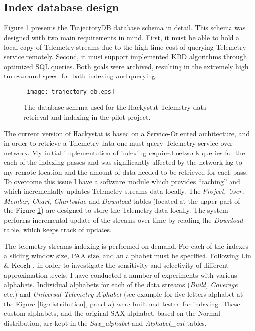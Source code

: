 \subsection{Index database design} \label{indexing_design}
Figure \ref{fig:trajectory_db} presents the TrajectoryDB database schema in detail. This schema was designed with two main requirements in mind. First, it must be able to hold a local copy of Telemetry streams due to the high time cost of querying Telemetry service remotely. Second, it must support implemented KDD algorithms through optimized SQL queries. Both goals were archived, resulting in the extremely high turn-around speed for both indexing and querying.

\begin{figure}[tbp]
   \centering
   \texttt{[image: trajectory\_db.eps]}
   \caption{The database schema used for the Hackystat Telemetry data retrieval and indexing in the pilot project.}
   \label{fig:trajectory_db}
\end{figure}

The current version of Hackystat is based on a Service-Oriented architecture, and in order to retrieve a Telemetry data one must query Telemetry service over network. My initial implementation of indexing required network queries for the each of the indexing passes and was significantly affected by the network lag to my remote location and the amount of data needed to be retrieved for each pass. To overcome this issue I have a software module which provides ``caching'' and which incrementally updates Telemetry streams data locally. The \textit{Project, User, Member, Chart, Chartvalue} and \textit{Download} tables (located at the upper part of the Figure \ref{fig:trajectory_db}) are designed to store the Telemetry data locally. The system performs incremental update of the streams over time by reading the \textit{Download} table, which keeps track of updates.

The telemetry streams indexing is performed on demand. For each of the indexes a sliding window size, PAA size, and an alphabet must be specified. Following Lin \& Keogh \cite{citeulike:2821475}, in order to investigate the sensitivity and selectivity of different approximation levels, I have conducted a number of experiments with various alphabets. Individual alphabets for each of the data streams (\textit{Build, Coverage} etc.) and \textit{Universal Telemetry Alphabet} (see example for five letters alphabet at the Figure \ref{fig:distribution}, panel $a$) were built and tested for indexing. These custom alphabets, and the original SAX alphabet, based on the Normal distribution, are kept in the \textit{Sax\_alphabet} and \textit{Alphabet\_cut} tables. 

